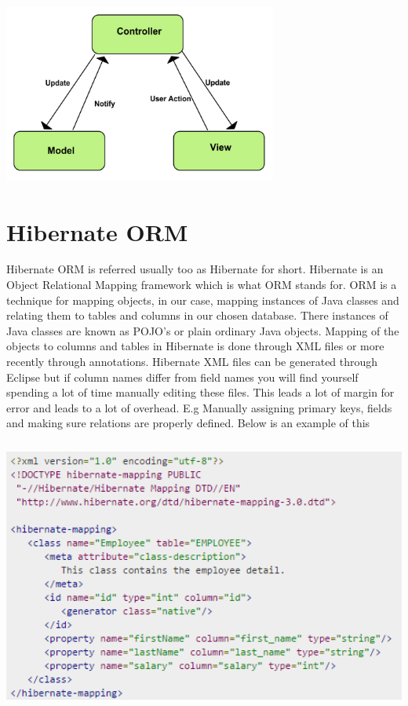 \begin{center}    
   	\includegraphics[height=6cm, width=9cm]{img/mvc.png}
\end{center}

\section{Hibernate ORM}

Hibernate ORM is referred usually too as Hibernate for short. Hibernate is an Object Relational Mapping framework which is what ORM stands for. ORM is a technique for mapping objects, in our case, mapping instances of Java classes and relating them to tables and columns in our chosen database. There instances of Java classes are known as POJO's or plain ordinary Java objects. Mapping of the objects to columns and tables in Hibernate is done through XML files or more recently through annotations. Hibernate XML files can be generated through Eclipse but if column names differ from field names you will find yourself spending a lot of time manually editing these files. This leads a lot of margin for error and leads to a lot of overhead. E.g Manually assigning primary keys, fields and making sure relations are properly defined. 
\noindent \newline \newline Below is an example of this 

\begin{center}    
	\includegraphics[height=9cm, width=14cm]{img/hibernatemapping.png}
\end{center}

